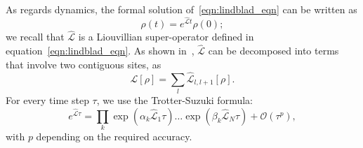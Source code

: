 As regards dynamics, the formal solution of~\ref{eqn:lindblad_eqn} can be written as
\begin{equation}
\label{eqn:lindblad_dinamics}
    \rho(t) = e^{\hat{\mathcal{L}}t}\rho(0);
\end{equation}
we recall that $\hat{\mathcal{L}}$ is a Liouvillian super-operator defined in equation~\ref{eqn:lindblad_eqn}. As shown in~\cite{Prosen_2009, PhysRevLett.93.207205}, $\hat{\mathcal{L}}$ can be decomposed into terms that involve two contiguous sites, as
\begin{equation}
    \hat{\mathcal{L}}[\rho] = \sum_l \hat{\mathcal{L}}_{l,l+1}[\rho].
\end{equation}
For every time step $\tau$, we use the Trotter-Suzuki formula:
\begin{equation*}
    e^{\hat{\mathcal{L}}\tau} = \prod_k \exp{(\alpha_k\hat{\mathcal{L}}_1\tau)}\dots\exp{(\beta_k\hat{\mathcal{L}}_N\tau)} + \mathcal{O}(\tau^p),
\end{equation*}
with $p$ depending on the required accuracy.



